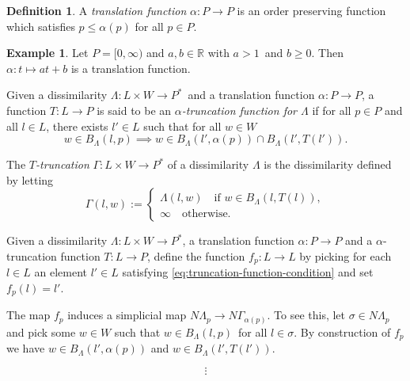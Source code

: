 \documentclass[10pt,a4paper]{article}
\theoremstyle{definition}
\newtheorem{defn}[thm]{Definition}
\newtheorem{ex}{Example}[thm]
\newcommand{\R}{\mathbb{R}}
\begin{document}
\begin{defn}
A \textit{translation function} $\alpha\colon P\to P$ is an order preserving function which satisfies $p\leq\alpha(p)$ for all $p\in P$. 
\end{defn}

\begin{ex}
Let $P=[0,\infty)$ and $a,b\in\R$ with $a>1$ and $b\geq 0$. Then $\alpha\colon t\mapsto at+b$ is a translation function.
\end{ex}

Given a dissimilarity $\Lambda\colon L\times W\to P^*$ and a translation function $\alpha\colon P\to P$, a function $T\colon L\to P$ is said to be an \textit{$\alpha$-truncation function for $\Lambda$} if for all $p\in P$ and all $l\in L$, there exists $l'\in L$ such that for all $w\in W$
\begin{equation}\label{eq:truncation-function-condition}
w\in B_\Lambda(l,p) \implies w\in B_\Lambda(l',\alpha(p))\cap B_\Lambda(l',T(l')).
\end{equation}

The \textit{$T$-truncation} $\Gamma\colon L\times W\to P^*$ of a dissimilarity $\Lambda$ is the dissimilarity defined by letting
$$
\Gamma(l,w):=\begin{cases}
	\Lambda(l,w)\quad\text{if }w\in B_\Lambda(l, T(l)),\\
	\infty\quad\text{otherwise.}
\end{cases}
$$

Given a dissimilarity $\Lambda\colon L\times W\to P^*$, a translation function $\alpha\colon P\to P$ and a $\alpha$-truncation function $T\colon L\to P$, define the function $f_p\colon L\to L$ by picking for each $l\in L$ an element $l'\in L$ satisfying \cref{eq:truncation-function-condition} and set $f_p(l)=l'$.

The map $f_p$ induces a simplicial map $N\Lambda_p\to N\Gamma_{\alpha(p)}$. To see this, let $\sigma\in N\Lambda_p$ and pick some $w\in W$ such that $w\in B_\Lambda(l,p)$ for all $l\in\sigma$. By construction of $f_p$ we have $w\in B_\Lambda(l',\alpha(p))$ and $w\in B_\Lambda(l',T(l'))$.


$$
\vdots
$$



\printbibliography
\end{document}
